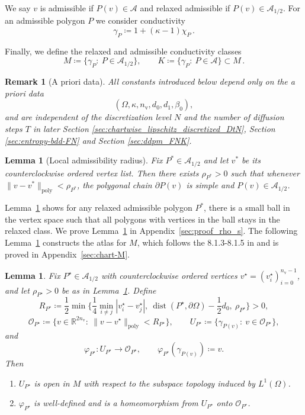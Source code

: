 \documentclass{article}
\newcommand{\R}{\mathbb{R}}
\newtheorem{lemma}[theorem]{Lemma}
\newtheorem{remark}{Remark}[section]
\newcommand{\dist}{\operatorname{dist}}
\begin{document}
We say $v$ is admissible if $P(v) \in \mathcal{A}$ and  relaxed admissible if $P(v) \in \mathcal{A}_{1/2}$. 
For an admissible polygon $P$ we consider conductivity
\[
\gamma_{P}\coloneqq 1+(\kappa-1)\chi_{P}\,.
\]

Finally, we define the relaxed and admissible conductivity classes
\[
M\coloneqq \{\gamma_P:\ P\in\mathcal A_{1/2}\},
\qquad
K\coloneqq \{\gamma_P:\ P\in\mathcal A\}\subset M\,.
\]

\begin{remark}[A priori data]\label{rem:apriori_poly}
All constants introduced below depend only on the \emph{a priori data}
\[
(\Omega,\kappa,n_{\mathrm v},d_0,d_1, \beta_0),
\]
and are independent of the discretization level $N$ and the number of diffusion steps $T$ in later Section \ref{sec:chartwise_lipschitz_discretized_DtN}, Section \ref{sec:entropy-bdd-FN} and Section \ref{sec:ddpm_FNK}.
\end{remark}


\begin{lemma}[Local admissibility radius]\label{lem:rho_s}
Fix $P^\ast\in\mathcal A_{1/2}$ and let $v^\ast$ be its counterclockwise ordered vertex list.
Then there exists $\rho_{P^\ast}>0$ such that whenever $\|v-v^\ast\|_{\mathrm{poly}}<\rho_{P^\ast}$,
the polygonal chain $\partial P(v)$ is simple and $P(v)\in\mathcal A_{1/2}$.
\end{lemma}
Lemma~\ref{lem:rho_s} shows for any relaxed admissible polygon $P^\ast$, there is a small ball in the vertex space such that all polygons with vertices in the ball stays
in the relaxed class. We prove Lemma~\ref{lem:rho_s} in Appendix~\ref{sec:proof_rho_s}. The following Lemma~\ref{lem:chart-M} constructs the atlas for $M$, which follows the 8.1.3-8.1.5 in \citep{alberti2022inverse} and is proved in Appendix~\ref{sec:chart-M}.

\begin{lemma}\label{lem:chart-M}
Fix $P^\star\in\mathcal A_{1/2}$ with counterclockwise ordered vertices
$v^\star=(v_i^\star)_{i=0}^{n_{\mathrm v}-1}$, and let $\rho_{P^\star}>0$ be as in
Lemma~\ref{lem:rho_s}. Define
\[
R_{P^\star}\coloneqq \frac12\min\Big\{\frac14\min_{i\neq j}|v_i^\star-v_j^\star|,\ 
\dist(P^\star,\partial\Omega)-\frac12 d_0,\ \rho_{P^\star}\Big\}>0,
\]
\[
\mathcal O_{P^\star}\coloneqq \Big\{v\in\R^{2n_{\mathrm v}}:\ \|v-v^\star\|_{\mathrm{poly}}<R_{P^\star}\Big\},
\qquad
U_{P^\star}\coloneqq \Big\{\gamma_{P(v)}:\ v\in\mathcal O_{P^\star}\Big\}, 
\]
and
\[
\varphi_{P^\star}:U_{P^\star}\to\mathcal O_{P^\star},\qquad
\varphi_{P^\star}(\gamma_{P(v)})\coloneqq v .
\]
Then
\begin{enumerate}
\item[(i)] $U_{P^\star}$ is open in $M$ with respect to the subspace topology induced by $L^1(\Omega)$.
\item[(ii)] $\varphi_{P^\star}$ is well-defined and is a homeomorphism from $U_{P^\star}$ onto
$\mathcal O_{P^\star}$. 
\end{enumerate}
\end{lemma}
\end{document}
